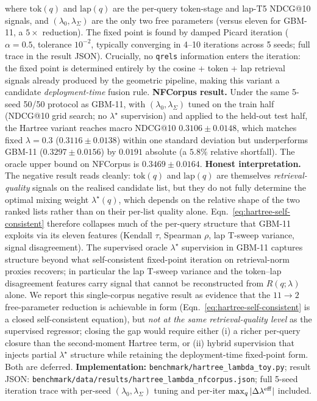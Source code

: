 \documentclass[review,1p]{elsarticle}
\begin{document}
where $\mathrm{tok}(q)$ and $\mathrm{lap}(q)$ are the per-query token-stage and lap-T5 NDCG@10 signals, and $(\lambda_0,\lambda_\Sigma)$ are the only two free parameters (versus eleven for GBM-11, a $5\times$ reduction). The fixed point is found by damped Picard iteration ($\alpha=0.5$, tolerance $10^{-2}$, typically converging in 4--10 iterations across 5 seeds; full trace in the result JSON). Crucially, no \texttt{qrels} information enters the iteration: the fixed point is determined entirely by the cosine + token + lap retrieval signals already produced by the geometric pipeline, making this variant a candidate \emph{deployment-time} fusion rule. \textbf{NFCorpus result.} Under the same 5-seed 50/50 protocol as GBM-11, with $(\lambda_0,\lambda_\Sigma)$ tuned on the train half (NDCG@10 grid search; no $\lambda^\star$ supervision) and applied to the held-out test half, the Hartree variant reaches macro NDCG@10 $0.3106 \pm 0.0148$, which matches fixed $\lambda=0.3$ ($0.3116 \pm 0.0138$) within one standard deviation but underperforms GBM-11 ($0.3297 \pm 0.0156$) by $0.0191$ absolute (a $5.8\%$ relative shortfall). The oracle upper bound on NFCorpus is $0.3469 \pm 0.0164$. \textbf{Honest interpretation.} The negative result reads cleanly: $\mathrm{tok}(q)$ and $\mathrm{lap}(q)$ are themselves \emph{retrieval-quality} signals on the realised candidate list, but they do not fully determine the optimal mixing weight $\lambda^\star(q)$, which depends on the relative shape of the two ranked lists rather than on their per-list quality alone. Eqn.~\eqref{eq:hartree-self-consistent} therefore collapses much of the per-query structure that GBM-11 exploits via its eleven features (Kendall $\tau$, Spearman $\rho$, lap T-sweep variance, signal disagreement). The supervised oracle $\lambda^\star$ supervision in GBM-11 captures structure beyond what self-consistent fixed-point iteration on retrieval-norm proxies recovers; in particular the lap T-sweep variance and the token--lap disagreement features carry signal that cannot be reconstructed from $R(q;\lambda)$ alone. We report this single-corpus negative result as evidence that the $11 \to 2$ free-parameter reduction is achievable in form (Eqn.~\eqref{eq:hartree-self-consistent} is a closed self-consistent equation), but \emph{not at the same retrieval-quality level} as the supervised regressor; closing the gap would require either (i) a richer per-query closure than the second-moment Hartree term, or (ii) hybrid supervision that injects partial $\lambda^\star$ structure while retaining the deployment-time fixed-point form. Both are deferred. \textbf{Implementation:} \texttt{benchmark/hartree\_lambda\_toy.py}; result JSON: \texttt{benchmark/data/results/hartree\_lambda\_nfcorpus.json}; full 5-seed iteration trace with per-seed $(\lambda_0,\lambda_\Sigma)$ tuning and per-iter $\max_q|\Delta\lambda^{\rm eff}|$ included.
\end{document}
